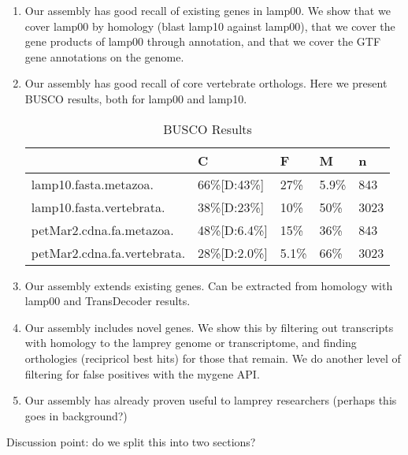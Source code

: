 \documentclass{article}
\begin{document}
\begin{enumerate}
\item Our assembly has good recall of existing genes in lamp00. We show that we cover lamp00 by
homology (blast lamp10 against lamp00), that we cover the gene products of lamp00 through 
annotation, and that we cover the GTF gene annotations on the genome.
\item Our assembly has good recall of core vertebrate orthologs. Here we present BUSCO results, 
both for lamp00 and lamp10.



\begin{table}[H]
\caption {BUSCO Results}
\begin{center}

\begin{tabular}{lllll}
\toprule
{} &            C &     F &     M &     n \\
\midrule
lamp10.fasta.metazoa.       &   66\%[D:43\%] &   27\% &  5.9\% &   843
\\
lamp10.fasta.vertebrata.    &   38\%[D:23\%] &   10\% &   50\% &  3023
\\
petMar2.cdna.fa.metazoa.    &  48\%[D:6.4\%] &   15\% &   36\% &   843
\\
petMar2.cdna.fa.vertebrata. &  28\%[D:2.0\%] &  5.1\% &   66\% &  3023
\\
\bottomrule
\end{tabular}



\end{center}
\end{table}

\item Our assembly extends existing genes. Can be extracted from homology with lamp00 and 
TransDecoder results.
\item Our assembly includes novel genes. We show this by filtering out transcripts with homology 
to the lamprey genome or transcriptome, and finding orthologies (recipricol best hits) for those 
that remain. We do another level of filtering for false positives with the mygene API.
\item Our assembly has already proven useful to lamprey researchers \cite{ren_genome-wide_2015}
(perhaps this goes in background?)
\end{enumerate}

Discussion point: do we split this into two sections?

\end{document}
